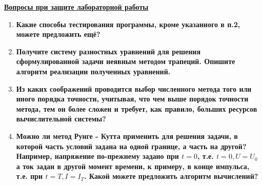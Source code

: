 \underline{\textbf{Вопросы при защите лабораторной работы}}\\

\begin{enumerate}
\item \textbf{Какие способы тестирования программы, кроме указанного в п.2, можете предложить ещё?}

\item \textbf{Получите систему разностных уравнений для решения сформулированной задачи неявным методом трапеций. Опишите алгоритм реализации полученных уравнений.}

\item \textbf{Из каких соображений проводится выбор численного метода того или иного порядка точности, учитывая, что чем выше порядок точности метода, тем он более сложен и требует, как правило, больших ресурсов вычислительной системы?}

\item \textbf{Можно ли метод Рунге - Кутта применить для решения задачи, в которой часть условий задана на одной границе, а часть на другой? Например, напряжение по-прежнему задано при $t = 0$, т.е. $t = 0, U = U_0$ а ток задан в другой момент времени, к примеру, в конце импульса, т.е. при $t = T, I = I_T$. Какой можете предложить алгоритм вычислений?}
\end{enumerate}